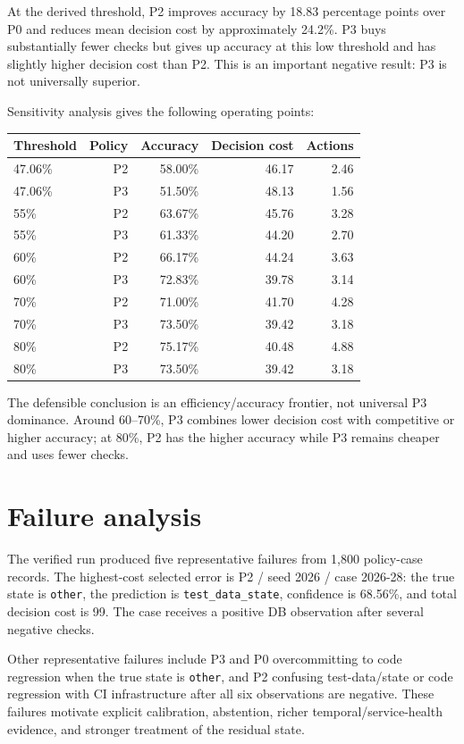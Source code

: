 \documentclass[11pt]{article}
\begin{document}
At the derived threshold, P2 improves accuracy by 18.83 percentage points over P0 and reduces mean decision cost by approximately 24.2\%. P3 buys substantially fewer checks but gives up accuracy at this low threshold and has slightly higher decision cost than P2. This is an important negative result: P3 is not universally superior.

Sensitivity analysis gives the following operating points:

\begin{center}
\begin{tabular}{lrrrr}
\toprule
Threshold & Policy & Accuracy & Decision cost & Actions\\
\midrule
47.06\% & P2 & 58.00\% & 46.17 & 2.46\\
47.06\% & P3 & 51.50\% & 48.13 & 1.56\\
55\% & P2 & 63.67\% & 45.76 & 3.28\\
55\% & P3 & 61.33\% & 44.20 & 2.70\\
60\% & P2 & 66.17\% & 44.24 & 3.63\\
60\% & P3 & 72.83\% & 39.78 & 3.14\\
70\% & P2 & 71.00\% & 41.70 & 4.28\\
70\% & P3 & 73.50\% & 39.42 & 3.18\\
80\% & P2 & 75.17\% & 40.48 & 4.88\\
80\% & P3 & 73.50\% & 39.42 & 3.18\\
\bottomrule
\end{tabular}
\end{center}

The defensible conclusion is an efficiency/accuracy frontier, not universal P3 dominance. Around 60--70\%, P3 combines lower decision cost with competitive or higher accuracy; at 80\%, P2 has the higher accuracy while P3 remains cheaper and uses fewer checks.

\section{Failure analysis}
The verified run produced five representative failures from 1,800 policy-case records. The highest-cost selected error is P2 / seed 2026 / case 2026-28: the true state is \texttt{other}, the prediction is \texttt{test\_data\_state}, confidence is 68.56\%, and total decision cost is 99. The case receives a positive DB observation after several negative checks.

Other representative failures include P3 and P0 overcommitting to code regression when the true state is \texttt{other}, and P2 confusing test-data/state or code regression with CI infrastructure after all six observations are negative. These failures motivate explicit calibration, abstention, richer temporal/service-health evidence, and stronger treatment of the residual state.
\end{document}
